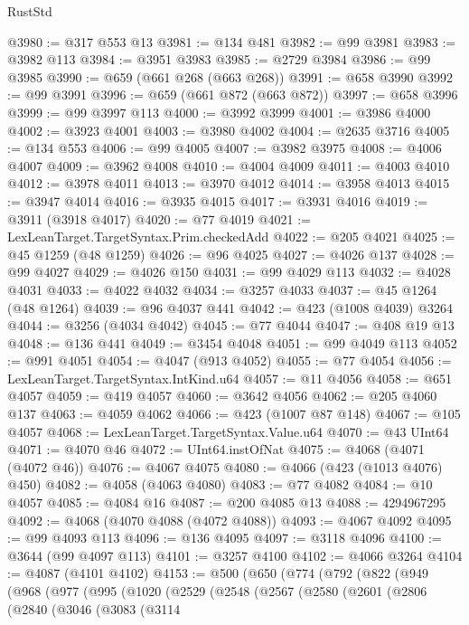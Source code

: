 \begin{lexlean}{RustStd}
\begin{coremodule}
@3980 := @317 @553 @13
@3981 := @134 @481
@3982 := @99 @3981
@3983 := @3982 @113
@3984 := @3951 @3983
@3985 := @2729 @3984
@3986 := @99 @3985
@3990 := @659 (@661 @268 (@663 @268))
@3991 := @658 @3990
@3992 := @99 @3991
@3996 := @659 (@661 @872 (@663 @872))
@3997 := @658 @3996
@3999 := @99 @3997 @113
@4000 := @3992 @3999
@4001 := @3986 @4000
@4002 := @3923 @4001
@4003 := @3980 @4002
@4004 := @2635 @3716
@4005 := @134 @553
@4006 := @99 @4005
@4007 := @3982 @3975
@4008 := @4006 @4007
@4009 := @3962 @4008
@4010 := @4004 @4009
@4011 := @4003 @4010
@4012 := @3978 @4011
@4013 := @3970 @4012
@4014 := @3958 @4013
@4015 := @3947 @4014
@4016 := @3935 @4015
@4017 := @3931 @4016
@4019 := @3911 (@3918 @4017)
@4020 := @77 @4019
@4021 := LexLeanTarget.TargetSyntax.Prim.checkedAdd
@4022 := @205 @4021
@4025 := @45 @1259 (@48 @1259)
@4026 := @96 @4025
@4027 := @4026 @137
@4028 := @99 @4027
@4029 := @4026 @150
@4031 := @99 @4029 @113
@4032 := @4028 @4031
@4033 := @4022 @4032
@4034 := @3257 @4033
@4037 := @45 @1264 (@48 @1264)
@4039 := @96 @4037 @441
@4042 := @423 (@1008 @4039) @3264
@4044 := @3256 (@4034 @4042)
@4045 := @77 @4044
@4047 := @408 @19 @13
@4048 := @136 @441
@4049 := @3454 @4048
@4051 := @99 @4049 @113
@4052 := @991 @4051
@4054 := @4047 (@913 @4052)
@4055 := @77 @4054
@4056 := LexLeanTarget.TargetSyntax.IntKind.u64
@4057 := @11 @4056
@4058 := @651 @4057
@4059 := @419 @4057
@4060 := @3642 @4056
@4062 := @205 @4060 @137
@4063 := @4059 @4062
@4066 := @423 (@1007 @87 @148)
@4067 := @105 @4057
@4068 := LexLeanTarget.TargetSyntax.Value.u64
@4070 := @43 UInt64
@4071 := @4070 @46
@4072 := UInt64.instOfNat
@4075 := @4068 (@4071 (@4072 @46))
@4076 := @4067 @4075
@4080 := @4066 (@423 (@1013 @4076) @450)
@4082 := @4058 (@4063 @4080)
@4083 := @77 @4082
@4084 := @10 @4057
@4085 := @4084 @16
@4087 := @200 @4085 @13
@4088 := 4294967295
@4092 := @4068 (@4070 @4088 (@4072 @4088))
@4093 := @4067 @4092
@4095 := @99 @4093 @113
@4096 := @136 @4095
@4097 := @3118 @4096
@4100 := @3644 (@99 @4097 @113)
@4101 := @3257 @4100
@4102 := @4066 @3264
@4104 := @4087 (@4101 @4102)
@4153 := @500
    (@650
      (@774
        (@792
          (@822
            (@949
              (@968
                (@977
                  (@995
                    (@1020
                      (@2529
                        (@2548
                          (@2567
                            (@2580
                              (@2601
                                (@2806
                                  (@2840
                                    (@3046
                                      (@3083
                                        (@3114

\end{coremodule}
\end{lexlean}
